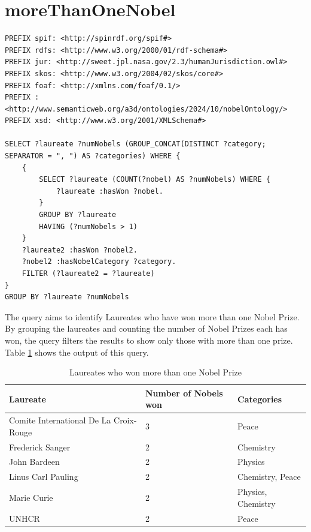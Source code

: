 \documentclass{article}
\begin{document}
\section{moreThanOneNobel}

\begin{lstlisting}
PREFIX spif: <http://spinrdf.org/spif#>
PREFIX rdfs: <http://www.w3.org/2000/01/rdf-schema#>
PREFIX jur: <http://sweet.jpl.nasa.gov/2.3/humanJurisdiction.owl#>
PREFIX skos: <http://www.w3.org/2004/02/skos/core#>
PREFIX foaf: <http://xmlns.com/foaf/0.1/>
PREFIX : <http://www.semanticweb.org/a3d/ontologies/2024/10/nobelOntology/>
PREFIX xsd: <http://www.w3.org/2001/XMLSchema#>

SELECT ?laureate ?numNobels (GROUP_CONCAT(DISTINCT ?category; SEPARATOR = ", ") AS ?categories) WHERE {
    {
        SELECT ?laureate (COUNT(?nobel) AS ?numNobels) WHERE {
            ?laureate :hasWon ?nobel.
        }
        GROUP BY ?laureate
        HAVING (?numNobels > 1)
    }
    ?laureate2 :hasWon ?nobel2.
    ?nobel2 :hasNobelCategory ?category.
    FILTER (?laureate2 = ?laureate)
}
GROUP BY ?laureate ?numNobels
\end{lstlisting}
The query aims to identify Laureates who have won more than one Nobel Prize. By grouping the laureates and counting the number of Nobel Prizes each has won, the query filters the results to show only those with more than one prize. 
Table \ref{tab:moreThanOneNobel} shows the output of this query.

\begin{table}[H]
	\caption{Laureates who won more than one Nobel Prize}
	\centering
	\begin{tabular}{|l|l|l|}
		\hline
		\textbf{Laureate} & \textbf{Number of Nobels won} & \textbf{Categories} \\ \hline
		Comite International De La Croix-Rouge              & 3       & Peace                        \\ \hline
		Frederick Sanger          & 2           & Chemistry                        \\ \hline
		John Bardeen                 & 2      & Physics                         \\ \hline
		Linus Carl Pauling          & 2         & Chemistry, Peace                         \\ \hline
		Marie Curie            & 2      & Physics, Chemistry                         \\ \hline
		UNHCR            & 2         & Peace                         \\ \hline
	\end{tabular}
	\label{tab:moreThanOneNobel}
\end{table}
\end{document}
